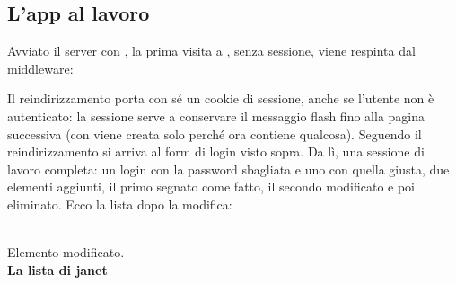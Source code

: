 \subsection{L'app al lavoro}

Avviato il server con , la prima visita a ,
senza sessione, viene respinta dal middleware:


Il reindirizzamento porta con sé un cookie di sessione, anche se l'utente non è
autenticato: la sessione serve a conservare il messaggio flash fino alla
pagina successiva (con  viene creata solo
perché ora contiene qualcosa). Seguendo il reindirizzamento si arriva al form
di login visto sopra. Da lì, una sessione di lavoro completa: un login con la
password sbagliata e uno con quella giusta, due elementi aggiunti, il primo
segnato come fatto, il secondo modificato e poi eliminato. Ecco la lista dopo
la modifica:

\begin{browser}
  \Lato\small
  \quad{}\quad{}\quad{}\\[8pt]
  {\color{css-green}Elemento modificato.}\\[6pt]
  {\bfseries\LARGE La lista di janet}\\[8pt]
  \wtcampo[3.0cm]{}\\[6pt]
  \hspace*{1.2em}\textbullet\hspace{0.6em}\\[2pt]
  \hspace*{1.2em}\textbullet\hspace{0.6em}
\end{browser}

